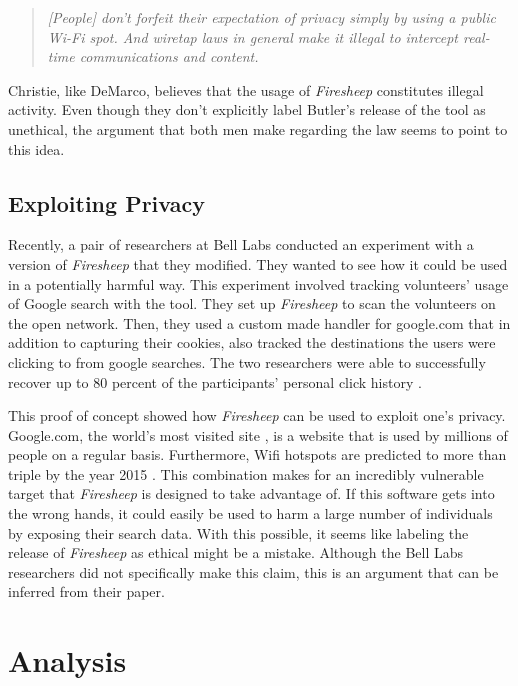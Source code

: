 \documentclass[11pt]{article}
\begin{document}
\begin{multicols}{2}
\begin{quote}
  \emph{[People] don't forfeit their expectation of privacy simply by using a public Wi-Fi spot. And wiretap laws in general make it illegal to intercept real-time communications and content.} \cite{legal_cw}
\end{quote}

Christie, like DeMarco, believes that the usage of \emph{Firesheep} constitutes illegal activity. Even though they don't explicitly label Butler's release of the tool as unethical, the argument that both men make regarding the law seems to point to this idea.

\subsection{Exploiting Privacy}
Recently, a pair of researchers at Bell Labs conducted an experiment with a version of \emph{Firesheep} that they modified. They wanted to see how it could be used in a potentially harmful way. This experiment involved tracking volunteers' usage of Google search with the tool. They set up \emph{Firesheep} to scan the volunteers on the open network. Then, they used a custom made handler for google.com that in addition to capturing their cookies, also tracked the destinations the users were clicking to from google searches. The two researchers were able to successfully recover up to 80 percent of the participants' personal click history \cite{show_me_your_cookie}.

This proof of concept showed how \emph{Firesheep} can be used to exploit one's privacy. Google.com, the world's most visited site \cite{alexa}, is a website that is used by millions of people on a regular basis. Furthermore, Wifi hotspots are predicted to more than triple by the year 2015 \cite{informa}. This combination makes for an incredibly vulnerable target that \emph{Firesheep} is designed to take advantage of. If this software gets into the wrong hands, it could easily be used to harm a large number of individuals by exposing their search data. With this possible, it seems like labeling the release of \emph{Firesheep} as ethical might be a mistake. Although the Bell Labs researchers did not specifically make this claim, this is an argument that can be inferred from their paper.

\section{Analysis}

\end{multicols}
\end{document}
